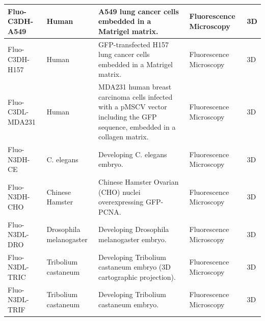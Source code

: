 \documentclass[./dissertation.tex]{subfiles}
\begin{document}
\begin{table}[ht]
\begin{tabular}{|l|p{2cm}|p{5cm}|p{2cm}|p{2cm}|}
        Fluo-C3DH-A549        & Human                   & A549 lung cancer cells embedded in a Matrigel matrix.                                                                       & Fluorescence Microscopy                             & 3D                 \\ \hline
        Fluo-C3DH-H157        & Human                   & GFP-transfected H157 lung cancer cells embedded in a Matrigel matrix.                                                       & Fluorescence Microscopy                             & 3D                 \\ \hline
        Fluo-C3DL-MDA231      & Human                   & MDA231 human breast carcinoma cells infected with a pMSCV vector including the GFP sequence, embedded in a collagen matrix. & Fluorescence Microscopy                             & 3D                 \\ \hline
        Fluo-N3DH-CE          & C. elegans              & Developing C. elegans embryo.                                                                                               & Fluorescence Microscopy                             & 3D                 \\ \hline
        Fluo-N3DH-CHO         & Chinese Hamster         & Chinese Hamster Ovarian (CHO) nuclei overexpressing GFP-PCNA.                                                               & Fluorescence Microscopy                             & 3D                 \\ \hline
        Fluo-N3DL-DRO         & Drosophila melanogaster & Developing Drosophila melanogaster embryo.                                                                                  & Fluorescence Microscopy                             & 3D                 \\ \hline
        Fluo-N3DL-TRIC        & Tribolium castaneum     & Developing Tribolium castaneum embryo (3D cartographic projection).                                                         & Fluorescence Microscopy                             & 3D                 \\ \hline
        Fluo-N3DL-TRIF        & Tribolium castaneum     & Developing Tribolium castaneum embryo.                                                                                      & Fluorescence Microscopy                             & 3D                 \\ \hline
    \end{tabular}
\end{table}
\end{document}
